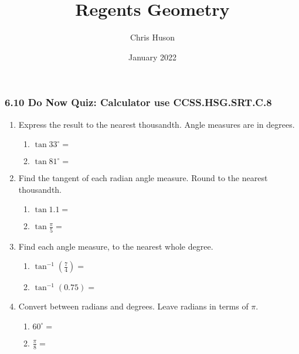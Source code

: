 \documentclass[12pt, twoside]{article}
\title{Regents Geometry}
\author{Chris Huson}
\date{January 2022}
\begin{document}
\subsubsection*{6.10 Do Now Quiz: Calculator use \hfill CCSS.HSG.SRT.C.8}
\begin{enumerate}
  \item Express the result to the nearest thousandth. Angle measures are in degrees. \vspace{.25cm}
  \begin{multicols}{2}
    \begin{enumerate}
      \item $\displaystyle \tan 33^\circ = $ \vspace{1cm}
      \item $\displaystyle \tan 81^\circ = $
    \end{enumerate}
  \end{multicols} \vspace{1cm}
  
  \item Find the tangent of each radian angle measure. Round to the nearest thousandth. \vspace{.25cm}
  \begin{multicols}{2}
    \begin{enumerate}
      \item $\displaystyle \tan 1.1 = $ \vspace{1cm}
      \item $\displaystyle \tan \frac{\pi}{5} = $
    \end{enumerate}
  \end{multicols} \vspace{1cm}

\item Find each angle measure, to the nearest whole degree.\vspace{.25cm}
\begin{multicols}{2}
  \begin{enumerate}
    \item $\displaystyle \tan^{-1} (\frac{7}{4}) = $ \vspace{1cm}
    \item $\tan^{-1} (0.75) =$
  \end{enumerate}
\end{multicols} \vspace{1cm}

\item Convert between radians and degrees. Leave radians in terms of $\pi$.\vspace{.25cm}
\begin{multicols}{2}
  \begin{enumerate}
    \item $60^\circ = $ \vspace{1cm}
    \item $\displaystyle \frac{\pi}{8} =$
  \end{enumerate}
\end{multicols} \vspace{1cm}


\end{enumerate}
\end{document}
